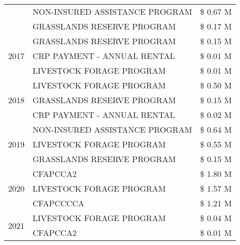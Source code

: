 \begin{tabular}{llr}
 & NON-INSURED ASSISTANCE PROGRAM & \$ 0.67 M \\
 & GRASSLANDS RESERVE PROGRAM & \$ 0.17 M \\
\cline{1-3}
\multirow[t]{3}{*}{2017} & GRASSLANDS RESERVE PROGRAM & \$ 0.15 M \\
 & CRP PAYMENT - ANNUAL RENTAL & \$ 0.01 M \\
 & LIVESTOCK FORAGE PROGRAM & \$ 0.01 M \\
\cline{1-3}
\multirow[t]{3}{*}{2018} & LIVESTOCK FORAGE PROGRAM & \$ 0.50 M \\
 & GRASSLANDS RESERVE PROGRAM & \$ 0.15 M \\
 & CRP PAYMENT - ANNUAL RENTAL & \$ 0.02 M \\
\cline{1-3}
\multirow[t]{3}{*}{2019} & NON-INSURED ASSISTANCE PROGRAM & \$ 0.64 M \\
 & LIVESTOCK FORAGE PROGRAM & \$ 0.55 M \\
 & GRASSLANDS RESERVE PROGRAM & \$ 0.15 M \\
\cline{1-3}
\multirow[t]{3}{*}{2020} & CFAPCCA2 & \$ 1.80 M \\
 & LIVESTOCK FORAGE PROGRAM & \$ 1.57 M \\
 & CFAPCCCCA & \$ 1.21 M \\
\cline{1-3}
\multirow[t]{2}{*}{2021} & LIVESTOCK FORAGE PROGRAM & \$ 0.04 M \\
 & CFAPCCA2 & \$ 0.01 M \\
\cline{1-3}
\bottomrule
\end{tabular}
